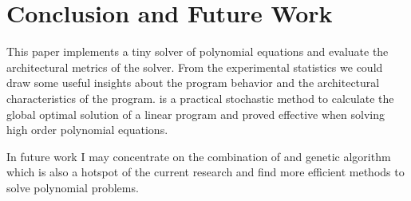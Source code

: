 \section{Conclusion and Future Work}
\label{sec:conclusion}
This paper implements a tiny \SA solver of polynomial equations and evaluate the architectural metrics of the solver. From the experimental statistics we could draw some useful insights about the program behavior and the architectural characteristics of the program. \SA is a practical stochastic method to calculate the global optimal solution of a linear program and proved effective when solving high order polynomial equations. 

In future work I may concentrate on the combination of \SA and genetic algorithm which is also a hotspot of the current research and find more efficient methods to solve polynomial problems.   